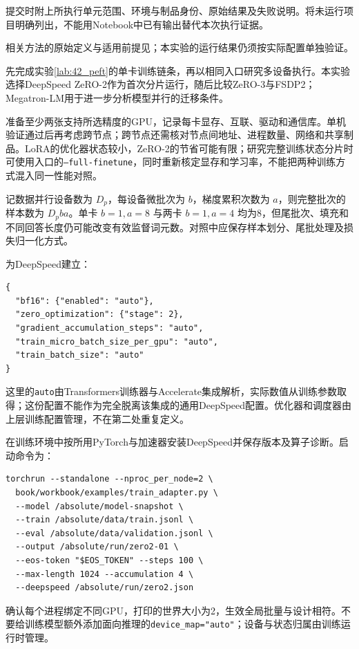 提交时附上所执行单元范围、环境与制品身份、原始结果及失败说明。将未运行项目明确列出，不能用Notebook中已有输出替代本次执行证据。

相关方法的原始定义与适用前提见\cite{rajbhandari2020zero}；本实验的运行结果仍须按实际配置单独验证。


先完成实验\ref{lab:42_peft}的单卡训练链条，再以相同入口研究多设备执行。本实验选择DeepSpeed ZeRO-2作为首次分片运行，随后比较ZeRO-3与FSDP2；Megatron-LM用于进一步分析模型并行的迁移条件\cite{deepspeed2026framework,pytorch2026fsdp2,megatron2026framework}。

准备至少两张支持所选精度的GPU，记录每卡显存、互联、驱动和通信库。单机验证通过后再考虑跨节点；跨节点还需核对节点间地址、进程数量、网络和共享制品。LoRA的优化器状态较小，ZeRO-2的节省可能有限；研究完整训练状态分片时可使用入口的\texttt{--full-finetune}，同时重新核定显存和学习率，不能把两种训练方式混入同一性能对照。

记数据并行设备数为 $D_p$，每设备微批次为 $b$，梯度累积次数为 $a$，则完整批次的样本数为 $D_pba$。单卡 $b=1,a=8$ 与两卡 $b=1,a=4$ 均为8，但尾批次、填充和不同回答长度仍可能改变有效监督词元数。对照中应保存样本划分、尾批处理及损失归一化方式。

为DeepSpeed建立：
\begin{verbatim}
{
  "bf16": {"enabled": "auto"},
  "zero_optimization": {"stage": 2},
  "gradient_accumulation_steps": "auto",
  "train_micro_batch_size_per_gpu": "auto",
  "train_batch_size": "auto"
}
\end{verbatim}
这里的\texttt{auto}由Transformers训练器与Accelerate集成解析，实际数值从训练参数取得；这份配置不能作为完全脱离该集成的通用DeepSpeed配置\cite{huggingface2026accelerateframework}。优化器和调度器由上层训练配置管理，不在第二处重复定义。

在训练环境中按所用PyTorch与加速器安装DeepSpeed并保存版本及算子诊断。启动命令为：
\begin{verbatim}
torchrun --standalone --nproc_per_node=2 \
  book/workbook/examples/train_adapter.py \
  --model /absolute/model-snapshot \
  --train /absolute/data/train.jsonl \
  --eval /absolute/data/validation.jsonl \
  --output /absolute/run/zero2-01 \
  --eos-token "$EOS_TOKEN" --steps 100 \
  --max-length 1024 --accumulation 4 \
  --deepspeed /absolute/run/zero2.json
\end{verbatim}
确认每个进程绑定不同GPU，打印的世界大小为2，生效全局批量与设计相符。不要给训练模型额外添加面向推理的\texttt{device\_map="auto"}；设备与状态归属由训练运行时管理。

